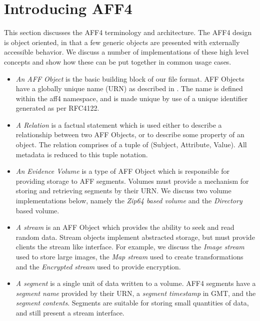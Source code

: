 \documentclass[10pt, conference]{IEEEtran}
\begin{document}
\section{Introducing AFF4}

This section discusses the AFF4 terminology and architecture. The AFF4
design is object oriented, in that a few generic objects are presented
with externally accessible behavior. We discuss a number of
implementations of these high level concepts and show how these can be
put together in common usage cases.

\begin{itemize}
\item \emph{An AFF Object} is the basic building block of our
  file format. AFF Objects have a globally unique name (URN) as
  described in \cite{RFC1737}. The name is defined within the aff4
  namespace, and is made unique by use of a unique identifier
  generated as per RFC4122\cite{RFC4122}.

\item \emph{A Relation} is a factual statement which is used either to describe
  a relationship between two AFF Objects, or to describe some property
  of an object. The relation comprises of a tuple of (Subject,
  Attribute, Value). All metadata is reduced to this tuple notation.

\item \emph{An Evidence Volume} is a type of AFF Object which is
responsible for providing storage to AFF segments. Volumes must
provide a mechanism for storing and retrieving segments by their
URN. We discuss two volume implementations below, namely the {\em
Zip64 based volume} and the {\em Directory} based volume.

\label{definitions}
\item \emph{A stream} is an AFF Object which provides the ability to
  seek and read random data. Stream objects implement abstracted
  storage, but must provide clients the stream like interface. For
  example, we discuss the {\em Image stream} used to store large
  images, the {\em Map stream} used to create transformations and the
  {\em Encrypted stream} used to provide encryption.

\item \emph{A segment} is a single unit of data written to a volume. AFF4
  segments have a \emph{segment name} provided by their URN, a
  \emph{segment timestamp} in GMT, and the \emph{segment
  contents}. Segments are suitable for storing small quantities of
  data, and still present a stream interface.


\end{itemize}
\end{document}
